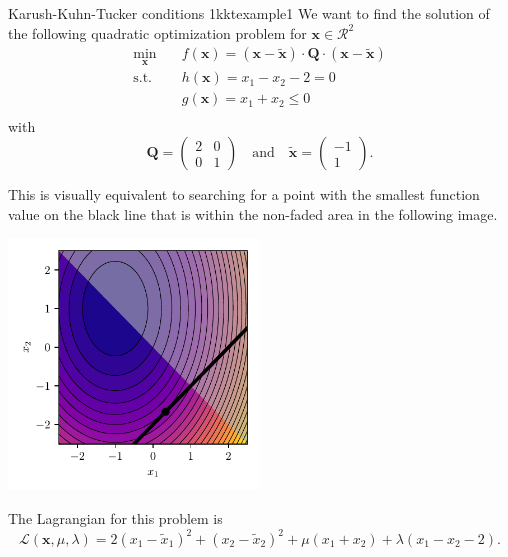\begin{example}{Karush-Kuhn-Tucker conditions 1}{kktexample1}
    We want to find the solution of the following quadratic optimization problem for $\mathbf{x} \in \mathcal{R}^2$
    \begin{equation}
        \begin{aligned}
            \min_{\mathbf{x}} \quad & f(\mathbf{x})= (\mathbf{x}-\tilde{\mathbf{x}}) \cdot \mathbf{Q} \cdot (\mathbf{x}-\tilde{\mathbf{x}})\\
            \textrm{s.t.} \quad     & h(\mathbf{x}) = x_1 - x_2 - 2 = 0  \\
                          \quad     & g(\mathbf{x}) = x_1 + x_2 \le 0  \\
        \end{aligned}
    \end{equation}
    with 
    \begin{equation}
        \mathbf{Q} = 
        \begin{pmatrix}
        2 & 0 \\
        0 & 1 
        \end{pmatrix} 
        \quad 
        \text{and}
        \quad
        \tilde{\mathbf{x}} = 
        \begin{pmatrix}
        -1\\
        1 
        \end{pmatrix}.
    \end{equation}

    This is visually equivalent to searching for a point with the smallest function value on the black line that is within the non-faded area in the following image.
    \begin{center}
        \includegraphics[width=0.5\textwidth]{figures/kkt_example_1.pdf}
    \end{center}

    The Lagrangian for this problem is 
    \begin{equation}
        \mathcal{\mathcal{L}}(\mathbf{x}, \mu, \lambda) = 2 (x_1-\tilde{x}_1)^2 + (x_2-\tilde{x}_2)^2 + \mu (x_1+x_2) + \lambda (x_1 - x_2 -2).
    \end{equation}


\end{example}
